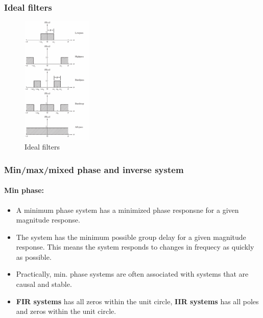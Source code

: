 \documentclass{article}
\begin{document}
\clearpage

\subsubsection{Ideal filters}

\begin{figure}[h!]
    \centering
    \includegraphics[width=0.3\textwidth]{figures/DFT/ideal_filters.png}
    \caption{Ideal filters}
    \label{fig:ideal_filters}
\end{figure}

\subsubsection{Min/max/mixed phase and inverse system}

\paragraph{Min phase:}
\begin{itemize}
    \item A minimum phase system has a minimized phase responsne for a given magnitude response.
    \item The system has the minimum possible group delay for a given magnitude response. This means the system responds to changes in frequecy as quickly as possible.
    \item Practically, min. phase systems are often associated with systems that are causal and stable.
    \item \textbf{FIR systems} has all zeros within the unit circle, \textbf{IIR systems} has all poles and zeros within the unit circle.
\end{itemize}
\end{document}
